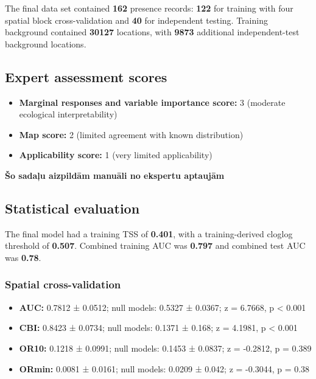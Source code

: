 \documentclass[
  openany]{book}
\providecommand{\tightlist}{%
  \setlength{\itemsep}{0pt}\setlength{\parskip}{0pt}}
\providecommand{\tightlist}{%
  \setlength{\itemsep}{0pt}%
  \setlength{\parskip}{0pt}%
}
\begin{document}
The final data set contained \textbf{162} presence records: \textbf{122} for training with four spatial block cross-validation and \textbf{40} for independent testing. Training background contained \textbf{30127} locations, with \textbf{9873} additional independent-test background locations.

\subsection*{Expert assessment scores}\label{expert-assessment-scores-3}

\begin{itemize}
\tightlist
\item
  \textbf{Marginal responses and variable importance score:} 3 (moderate ecological interpretability)
\item
  \textbf{Map score:} 2 (limited agreement with known distribution)
\item
  \textbf{Applicability score:} 1 (very limited applicability)
\end{itemize}

\textbf{Šo sadaļu aizpildām manuāli no ekspertu aptaujām}

\subsection*{Statistical evaluation}\label{statistical-evaluation-3}

The final model had a training TSS of \textbf{0.401}, with a training-derived cloglog threshold of \textbf{0.507}. Combined training AUC was \textbf{0.797} and combined test AUC was \textbf{0.78}.

\subsubsection*{Spatial cross-validation}\label{spatial-cross-validation-3}

\begin{itemize}
\tightlist
\item
  \textbf{AUC:} 0.7812 ± 0.0512; null models: 0.5327 ± 0.0367; z = 6.7668, p \textless{} 0.001
\item
  \textbf{CBI:} 0.8423 ± 0.0734; null models: 0.1371 ± 0.168; z = 4.1981, p \textless{} 0.001
\item
  \textbf{OR10:} 0.1218 ± 0.0991; null models: 0.1453 ± 0.0837; z = -0.2812, p = 0.389
\item
  \textbf{ORmin:} 0.0081 ± 0.0161; null models: 0.0209 ± 0.042; z = -0.3044, p = 0.38
\end{itemize}
\end{document}
